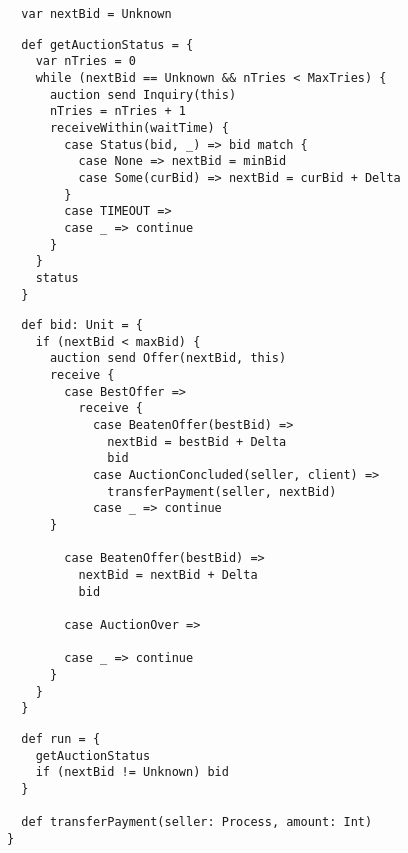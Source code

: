 \documentclass[11pt]{report}
\begin{document}
{\begin{verbatim}
  var nextBid = Unknown
\end{verbatim}
\begin{verbatim}
  def getAuctionStatus = {
    var nTries = 0
    while (nextBid == Unknown && nTries < MaxTries) {
      auction send Inquiry(this)
      nTries = nTries + 1
      receiveWithin(waitTime) {
        case Status(bid, _) => bid match {
          case None => nextBid = minBid
          case Some(curBid) => nextBid = curBid + Delta
        }
        case TIMEOUT =>
        case _ => continue
      }
    }
    status
  }
\end{verbatim}
\begin{verbatim}
  def bid: Unit = {
    if (nextBid < maxBid) {
      auction send Offer(nextBid, this)
      receive {
        case BestOffer =>
          receive {
            case BeatenOffer(bestBid) =>
              nextBid = bestBid + Delta
              bid
            case AuctionConcluded(seller, client) =>
     	      transferPayment(seller, nextBid)
            case _ => continue
	  }

        case BeatenOffer(bestBid) =>
          nextBid = nextBid + Delta
          bid

        case AuctionOver =>

        case _ => continue
      }
    }
  }
\end{verbatim}
\begin{verbatim}
  def run = {
    getAuctionStatus
    if (nextBid != Unknown) bid
  }

  def transferPayment(seller: Process, amount: Int)
}
\end{verbatim}
}
\end{document}
